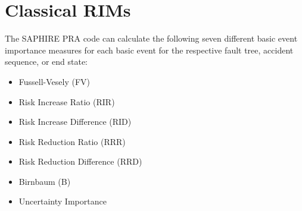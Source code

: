 \section{Classical RIMs}
\label{sec:classicalRIMs}

% 
% 

The SAPHIRE PRA code can calculate the following seven different basic event importance 
measures for each basic event for the respective fault tree, accident sequence, or end state:
\begin{itemize}
  \item Fussell-Vesely (FV)
  \item Risk Increase Ratio (RIR)
  \item Risk Increase Difference (RID)
  \item Risk Reduction Ratio (RRR)
  \item Risk Reduction Difference (RRD)
  \item Birnbaum (B)
  \item Uncertainty Importance
\end{itemize}   
  
